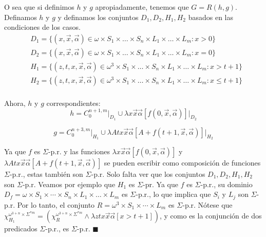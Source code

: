 \documentclass{article}
\begin{document}
O sea que si definimos $h$ y $g$ apropiadamente, tenemos que $G = R(h, g)$. Definamos $h$ y $g$ y definamos los conjuntos $D_1, D_2, H_1, H_2$ basados en las condiciones de los casos.\\
\begin{align*}
    &D_1 = \{(x, \vec{x}, \vec{\alpha}) \in \omega \times S_1 \times \dots \times S_n \times L_1 \times \dots \times L_m : x > 0 \}\\
    &D_2 = \{(x, \vec{x}, \vec{\alpha}) \in \omega \times S_1 \times \dots \times S_n \times L_1 \times \dots \times L_m : x = 0 \}\\
    &H_1 = \{(z, t, x, \vec{x}, \vec{\alpha}) \in \omega^3 \times S_1 \times \dots \times S_n \times L_1 \times \dots \times L_m : x > t + 1 \}\\
    &H_2 = \{(z, t, x, \vec{x}, \vec{\alpha}) \in \omega^3 \times S_1 \times \dots \times S_n \times L_1 \times \dots \times L_m : x \leq t + 1 \}\\
\end{align*}

Ahora, $h$ y $g$ correspondientes:
\[
h = C_0^{n+1,m} \big|_{D_1} \cup \lambda x \vec{x} \vec{\alpha} \left[ f(0, \vec{x}, \vec{\alpha}) \right] \big|_{D_2}
\]

\[
g = C_0^{n+3,m} \big|_{H_1} \cup \lambda A t x \vec{x} \vec{\alpha} \left[A + f(t+1, \vec{x}, \vec{\alpha}) \right] \big|_{H_2}
\]

Ya que $f$ es $\Sigma$-p.r. y las funciones $\lambda x \vec{x} \vec{\alpha} \left[f(0, \vec{x}, \vec{\alpha}) \right]$ 
y $\lambda A t x \vec{x} \vec{\alpha} \left[A + f(t+1, \vec{x}, \vec{\alpha}) \right]$ se pueden escribir como composición 
de funciones $\Sigma$-p.r., estas también son $\Sigma$-p.r. Solo falta ver que los conjuntos $D_1, D_2, H_1, H_2$ son $\Sigma$-p.r. 
Veamos por ejemplo que $H_1$ es $\Sigma$-pr. Ya que $f$ es $\Sigma$-p.r., su dominio $D_f = \omega \times S_1 \times \cdots \times S_n \times L_1 \times \dots \times L_m$ es $\Sigma$-p.r., 
lo que implica que $S_i$ y $L_j$ son $\Sigma$-p.r. Por lo tanto, el conjunto 
$R = \omega^3 \times S_1 \times \cdots \times L_m$ es $\Sigma$-p.r. 
Nótese que $\chi_{H_1}^{\omega^{3+n} \times \Sigma^{*m}} = (\chi_{R}^{\omega^{3+n} \times \Sigma^{*m}} \wedge \lambda z t x \vec{x} \vec{\alpha} [x > t+1])$, y como es la conjunción de dos predicados $\Sigma$-p.r., es $\Sigma$-p.r. \hfill $\blacksquare$
\end{document}
